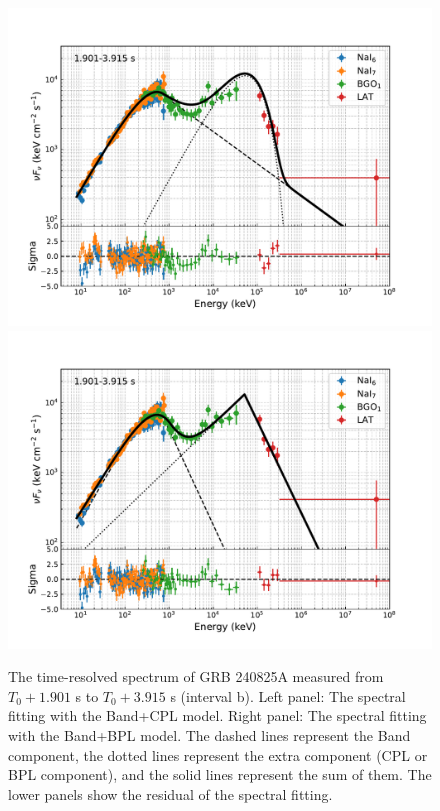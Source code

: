 \documentclass[twocolumn]{aastex631}
\begin{document}
\begin{figure}
\includegraphics[angle=0,scale=0.47]{SED_b_cpl.pdf}
\hspace{-0.6cm}
\includegraphics[angle=0,scale=0.47]{SED_b_bpl.pdf}\\
\caption{The time-resolved spectrum of GRB 240825A measured from $T_0+1.901$ s to
$T_0 +3.915$ s (interval b). Left panel: The spectral fitting with the Band+CPL model. 
Right panel: The spectral fitting with the Band+BPL model. 
The dashed lines represent the Band component, the dotted lines represent the extra component (CPL or BPL component), and the solid lines represent the sum of them. The lower panels show the residual of the spectral fitting.
}
\label{fig:spec_b}
\end{figure}
\end{document}
